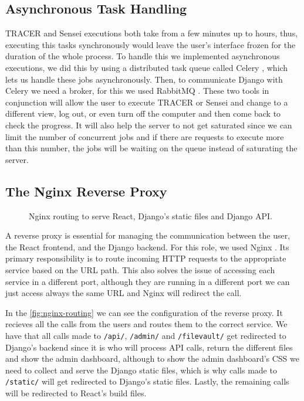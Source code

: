 \subsection{Asynchronous Task Handling}

\ac{TRACER} and Sensei executions both take from a few minutes up to hours,
thus, executing this tasks synchronously would leave the user's interface frozen
for the duration of the whole process.
To handle this we implemented asynchronous executions,
we did this by using a distributed task queue called Celery \autocite{Celery},
which lets us handle these jobs asynchronously.
Then, to communicate Django with Celery we need a broker,
for this we used RabbitMQ \autocite{RabbitMQ}.
These two tools in conjunction will allow the user to execute \ac{TRACER} or Sensei
and change to a different view, log out, or even turn off the computer
and then come back to check the progress.
It will also help the server to not get saturated
since we can limit the number of concurrent jobs
and if there are requests to execute more than this number,
the jobs will be waiting on the queue instead of saturating the server.


\subsection{The Nginx Reverse Proxy}

\begin{figure}[htbp]
    \centering
    
    \caption{Nginx routing to serve React, Django's static files and Django API.}
    \label{fig:nginx-routing}
\end{figure}

A reverse proxy is essential for managing the communication between
the user, the React frontend, and the Django backend.
For this role, we used Nginx \autocite{Nginx}.
Its primary responsibility is to route incoming HTTP requests to the appropriate service based on the URL path.
This also solves the issue of accessing each service in a different port,
although they are running in a different port
we can just access always the same URL and Nginx will redirect the call.

In the \autoref{fig:nginx-routing}
we can see the configuration of the reverse proxy.
It recieves all the calls from the users and routes them to the correct service.
We have that all calls made to \texttt{/api/}, \texttt{/admin/} and \texttt{/filevault/}
get redirected to Django's backend since it is who will process \ac{API} calls,
return the different files and show the admin dashboard,
although to show the admin dashboard's CSS
we need to collect and serve the Django static files,
which is why calls made to \texttt{/static/} will get redirected to Django's static files.
Lastly, the remaining calls will be redirected to React's build files.


